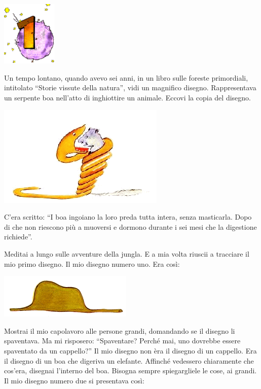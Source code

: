 \documentclass[11pt]{scrbook}
\begin{document}
\chapter{}
\begin{center}
\includegraphics{img/chapter1}
\end{center}

Un tempo lontano, quando avevo sei anni, in un libro sulle foreste
primordiali, intitolato ``Storie vissute della natura'', vidi un
magnifico disegno. Rappresentava un serpente boa nell'atto di
inghiottire un animale. Eccovi la copia del disegno.

\begin{center}
\includegraphics{img/1a}
\end{center}

C'era scritto: ``I boa ingoiano la loro preda tutta intera, senza
masticarla. Dopo di che non riescono più a muoversi e dormono durante i
sei mesi che la digestione richiede''.

Meditai a lungo sulle avventure della jungla. E a mia volta riuscii a
tracciare il mio primo disegno. Il mio disegno numero uno. Era così:

\begin{center}
\includegraphics{img/sombrero}
\end{center}

Mostrai il mio capolavoro alle persone grandi, domandando se il disegno
li spaventava. Ma mi risposero: ``Spaventare? Perché mai, uno dovrebbe
essere spaventato da un cappello?'' Il mio disegno non èra il disegno di
un cappello. Era il disegno di un boa che digeriva un elefante. Affinché
vedessero chiaramente che cos'era, disegnai l'interno del boa. Bisogna
sempre spiegargliele le cose, ai grandi. Il mio disegno numero due si
presentava così:
\end{document}
